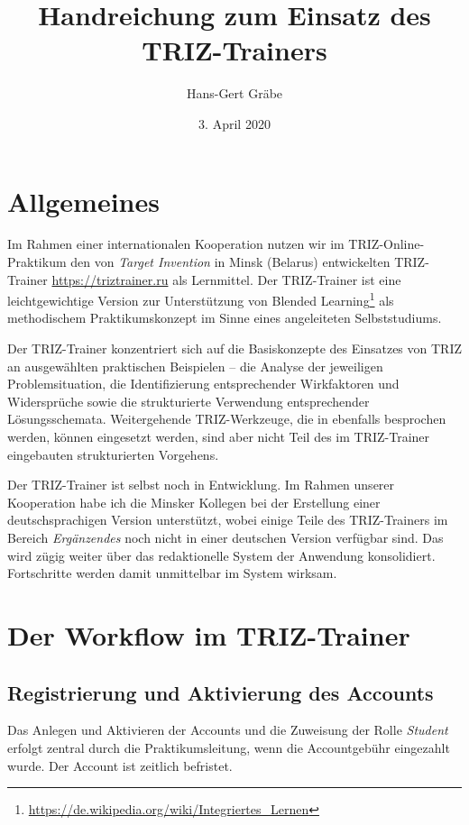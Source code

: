 \documentclass[11pt,a4paper]{article}
\title{Handreichung zum Einsatz des TRIZ-Trainers}
\author{Hans-Gert Gr\"abe}
\date{3. April 2020}
\begin{document}
\maketitle
\tableofcontents

\section{Allgemeines}

Im Rahmen einer internationalen Kooperation nutzen wir im
TRIZ-Online-Praktikum den von \emph{Target Invention} in Minsk (Belarus)
entwickelten TRIZ-Trainer \url{https://triztrainer.ru} als Lernmittel.  Der
TRIZ-Trainer ist eine leichtgewichtige Version zur Unterstützung von Blended
Learning\footnote{\url{https://de.wikipedia.org/wiki/Integriertes_Lernen}} als
methodischem Praktikumskonzept im Sinne eines angeleiteten Selbststudiums. 

Der TRIZ-Trainer konzentriert sich auf die Basiskonzepte des Einsatzes von
TRIZ an ausgewählten praktischen Beispielen -- die Analyse der jeweiligen
Problemsituation, die Identifizierung entsprechender Wirkfaktoren und
Widersprüche sowie die strukturierte Verwendung entsprechender
Lösungsschemata.  Weitergehende TRIZ-Werkzeuge, die in \cite{KS2017} ebenfalls
besprochen werden, können eingesetzt werden, sind aber nicht Teil des im
TRIZ-Trainer eingebauten strukturierten Vorgehens.

Der TRIZ-Trainer ist selbst noch in Entwicklung.  Im Rahmen unserer
Kooperation habe ich die Minsker Kollegen bei der Erstellung einer
deutschsprachigen Version unterstützt, wobei einige Teile des TRIZ-Trainers im
Bereich \emph{Ergänzendes} noch nicht in einer deutschen Version verfügbar
sind. Das wird zügig weiter über das redaktionelle System der Anwendung
konsolidiert.  Fortschritte werden damit unmittelbar im System wirksam.

\section{Der Workflow im TRIZ-Trainer}

\subsection{Registrierung und Aktivierung des Accounts}

Das Anlegen und Aktivieren der Accounts und die Zuweisung der Rolle
\emph{Student} erfolgt zentral durch die Praktikumsleitung, wenn die
Accountgebühr eingezahlt wurde.  Der Account ist zeitlich befristet.
\end{document}
